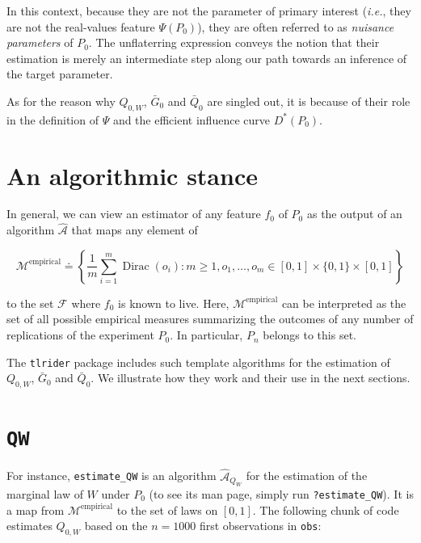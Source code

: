 \documentclass[11pt,openright,twoside]{book}
\DeclareMathOperator{\Dirac}{Dirac}
\newcommand{\Algo}{\widehat{\mathcal{A}}}
\newcommand{\defq}{\doteq}
\newcommand{\calF}{\mathcal{F}}
\newcommand{\calM}{\mathcal{M}}
\newcommand{\Gbar}{\bar{G}}
\newcommand{\Qbar}{\bar{Q}}
\theoremstyle{definition}
\theoremstyle{definition}
\theoremstyle{definition}
\theoremstyle{remark}
\begin{document}
In this context, because they are not the parameter of primary interest
(\emph{i.e.}, they are not the real-values feature \(\Psi(P_{0})\)), they are often
referred to as \emph{nuisance parameters} of \(P_{0}\). The unflaterring expression
conveys the notion that their estimation is merely an intermediate step along
our path towards an inference of the target parameter.

As for the reason why \(Q_{0,W}\), \(\Gbar_{0}\) and \(\Qbar_{0}\) are singled out,
it is because of their role in the definition of \(\Psi\) and the efficient
influence curve \(D^{*}(P_{0})\).


\hypertarget{an-algorithmic-stance}{%
\section{An algorithmic stance}\label{an-algorithmic-stance}}


In general, we can view an estimator of any feature \(f_0\) of \(P_{0}\) as the
output of an algorithm \(\Algo\) that maps any element of

\begin{equation*}    \calM^{\text{empirical}}     \defq    \left\{\frac{1}{m}
\sum_{i=1}^{m} \Dirac(o_{i}) : m \geq 1, o_{1}, \ldots, o_{m} \in [0,1] \times
\{0,1\} \times [0,1]\right\} \end{equation*}

to the set \(\calF\) where \(f_{0}\) is known to live. Here,
\(\calM^{\text{empirical}}\) can be interpreted as the set of all possible
empirical measures summarizing the outcomes of any number of replications of
the experiment \(P_{0}\). In particular, \(P_{n}\) belongs to this set.

The \texttt{tlrider} package includes such template algorithms for the estimation of
\(Q_{0,W}\), \(\Gbar_{0}\) and \(\Qbar_{0}\). We illustrate how they work and their
use in the next sections.

\hypertarget{nuisance-QW}{%
\section{\texorpdfstring{\texttt{QW}}{QW}}\label{nuisance-QW}}

For instance, \texttt{estimate\_QW} is an algorithm \(\Algo_{Q_{W}}\) for the estimation
of the marginal law of \(W\) under \(P_{0}\) (to see its man page, simply run
\texttt{?estimate\_QW}). It is a map from \(\calM^{\text{empirical}}\) to the set of
laws on \([0,1]\). The following chunk of code estimates \(Q_{0,W}\) based on the
\(n = 1000\) first observations in \texttt{obs}:
\end{document}
